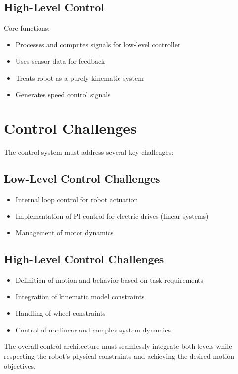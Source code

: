 \documentclass[openany]{book}
\theoremstyle{definition}
\theoremstyle{remark}
\newcommand{\note}[1]{
\begin{tcolorbox}[colback=green!5,colframe=green!40!black,title=Note]
 #1
\end{tcolorbox}
}
\begin{document}
\subsection{High-Level Control}

Core functions:
\begin{itemize}
    \item Processes and computes signals for low-level controller
    \item Uses sensor data for feedback
    \item Treats robot as a purely kinematic system
    \item Generates speed control signals
\end{itemize}

\section{Control Challenges}
The control system must address several key challenges:

\subsection{Low-Level Control Challenges}
\begin{itemize}
    \item Internal loop control for robot actuation
    \item Implementation of PI control for electric drives (linear systems)
    \item Management of motor dynamics
\end{itemize}

\subsection{High-Level Control Challenges}
\begin{itemize}
    \item Definition of motion and behavior based on task requirements
    \item Integration of kinematic model constraints
    \item Handling of wheel constraints
    \item Control of nonlinear and complex system dynamics
\end{itemize}

\note{The overall control architecture must seamlessly integrate both levels while respecting the robot's physical constraints and achieving the desired motion objectives.}
\end{document}

